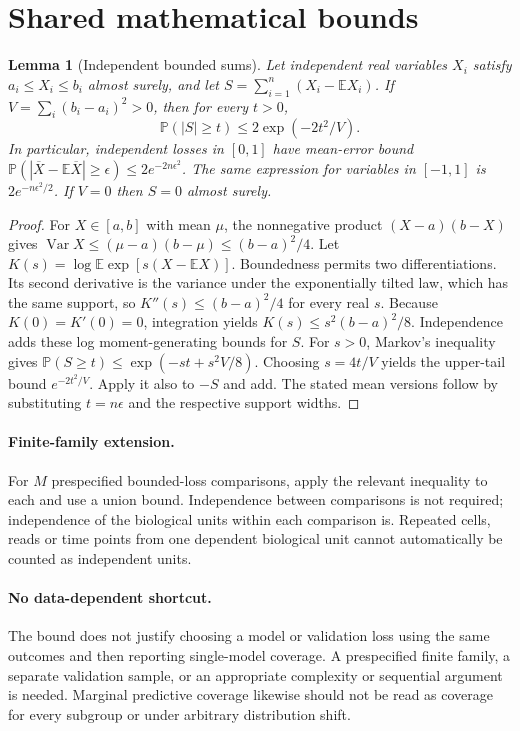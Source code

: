 \documentclass[11pt]{article}
\newcommand{\E}{\mathbb E}
\newcommand{\Prob}{\mathbb P}
\DeclareMathOperator{\Var}{Var}
\providecommand{\E}{\mathbb E}
\providecommand{\Prob}{\mathbb P}
\providecommand{\Var}{\operatorname{Var}}
\newtheorem{sharedlemma}{Lemma}[section]
\begin{document}
\appendix
\section{Shared mathematical bounds}\label{app:bounds}
\begin{sharedlemma}[Independent bounded sums]\label{lem:bounded}
Let independent real variables $X_i$ satisfy $a_i\leq X_i\leq b_i$ almost surely,
and let $S=\sum_{i=1}^n(X_i-\E X_i)$. If
$V=\sum_i(b_i-a_i)^2>0$, then for every $t>0$,
\[
 \Prob(|S|\geq t)\leq 2\exp(-2t^2/V).
\]
In particular, independent losses in $[0,1]$ have mean-error bound
$\Prob(|\overline X-\E\overline X|\geq\epsilon)
\leq2e^{-2n\epsilon^2}$. The same expression for variables in $[-1,1]$
is $2e^{-n\epsilon^2/2}$. If $V=0$ then $S=0$ almost surely.
\end{sharedlemma}
\begin{proof}
For $X\in[a,b]$ with mean $\mu$, the nonnegative product
$(X-a)(b-X)$ gives
$\Var X\leq(\mu-a)(b-\mu)\leq(b-a)^2/4$.
Let $K(s)=\log\E\exp[s(X-\E X)]$.
Boundedness permits two differentiations. Its second derivative is the variance
under the exponentially tilted law, which has the same support, so
$K''(s)\leq(b-a)^2/4$ for every real $s$.
Because $K(0)=K'(0)=0$, integration yields
$K(s)\leq s^2(b-a)^2/8$.
Independence adds these log moment-generating bounds for $S$.
For $s>0$, Markov's inequality gives
$\Prob(S\geq t)\leq\exp(-st+s^2V/8)$.
Choosing $s=4t/V$ yields the upper-tail bound $e^{-2t^2/V}$.
Apply it also to $-S$ and add. The stated mean versions follow by substituting
$t=n\epsilon$ and the respective support widths.
\end{proof}

\paragraph{Finite-family extension.}
For $M$ prespecified bounded-loss comparisons, apply the relevant inequality to
each and use a union bound. Independence between comparisons is not required;
independence of the biological units within each comparison is. Repeated cells,
reads or time points from one dependent biological unit cannot automatically be
counted as independent units.

\paragraph{No data-dependent shortcut.}
The bound does not justify choosing a model or validation loss using the same
outcomes and then reporting single-model coverage. A prespecified finite family,
a separate validation sample, or an appropriate complexity or sequential argument
is needed. Marginal predictive coverage likewise should not be read as coverage
for every subgroup or under arbitrary distribution shift.
\end{document}
